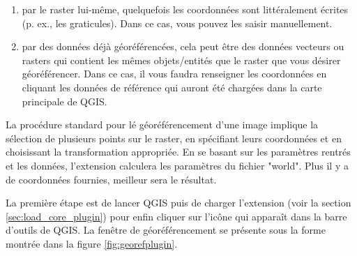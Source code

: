 
\begin{enumerate}
\item par le raster lui-même, quelquefois les coordonnées sont littéralement écrites (p. ex., les graticules). Dans ce cas, vous pouvez les saisir manuellement.
\item par des données déjà géoréférencées, cela peut être des données vecteurs ou rasters qui contient les mêmes objets/entités que le raster que vous désirer géoréférencer. Dans ce cas, il vous faudra renseigner les coordonnées en cliquant les données de référence qui auront été chargées dans la carte principale de QGIS.
\end{enumerate}


La procédure standard pour lé géoréférencement d'une image implique la sélection de plusieurs points sur le raster, en spécifiant leurs coordonnées et en choisissant la transformation appropriée. En se basant sur les paramètres rentrés et les données, l'extension calculera les paramètres du fichier "world". Plus il y a de coordonnées fournies, meilleur sera le résultat.


La première étape est de lancer QGIS puis de charger l'extension (voir la section \ref{sec:load_core_plugin}) pour enfin cliquer sur l'icône  qui apparaît dans la barre d'outils de QGIS. La fenêtre de géoréférencement se présente sous la forme montrée dans la figure \ref{fig:georefplugin}.
 
